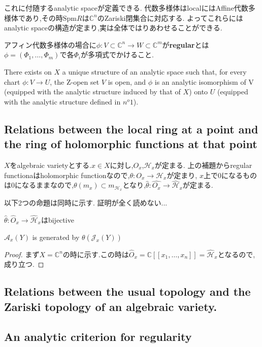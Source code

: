 これに付随するanalytic spaceが定義できる.
代数多様体はlocalにはAffine代数多様体であり,その時$\mathrm{Spm}R$は$\mathbb{C}^n$のZariski閉集合に対応する.
よってこれらにはanalytic spaceの構造が定まり,実は全体ではりあわせることができる.

アフィン代数多様体の場合に$\phi: V \subset \mathbb{C}^n \to W \subset \mathbb{C}^m$が\textbf{regular}とは
$\phi = (\Phi_1, \ldots, \Phi_m)$で各$\Phi_i$が多項式でかけること.

\begin{prop}
There exists on $X$ a unique structure of an analytic space such
 that, for every chart $\phi : V \to U$, the Z-open set $V$ is open, and $\phi$ is an analytic
 isomorphism of V (equipped with the analytic structure induced by that of $X$)
 onto $U$ (equipped with the analytic structure defined in $n^o 1$).
\end{prop}

\subsection{Relations between the local ring at a point and the ring of holomorphic functions at that point}
$X$をalgebraic varietyとする.$x \in X$に対し,$O_x$,$\mathcal{H}_x$が定まる.
上の補題からregular functionaはholomorphic functionなので,$\theta: O_x \to \mathcal{H}_x$が定まり,
$x$上で0になるものは0になるままなので,$\theta(m_x) \subset m_{\mathcal{H}_x}$となり,$\hat{\theta}: \hat{O_x} \to \hat{\mathcal{H}}_x$が定まる.

以下2つの命題は同時に示す.
証明が全く読めない...
\begin{prop}
 $\hat{\theta}: \hat{O}_x \to \hat{\mathcal{H}}_x$はbijective
\end{prop}

\begin{prop}
 $\mathcal{A}_x(Y)$ is generated by $\theta(\mathscr{J}_x(Y))$
\end{prop}

\begin{proof}
まず$X = \mathbb{C}^n$の時に示す.この時は$\hat{O}_x = \mathbb{C}[[x_1,\dots,x_n]] = \hat{\mathcal{H}}_x$となるので,成り立つ.
\end{proof}
\subsection{Relations between the usual topology and the Zariski topology of an algebraic variety.}

\subsection{An analytic criterion for regularity}

